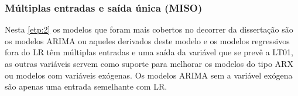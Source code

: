 \subsubsection{M\'ultiplas entradas e sa\'ida \'unica (MISO)}

Nesta \ref{etp:2} os modelos que foram mais cobertos no decorrer da dissertação são os modelos ARIMA ou aqueles derivados deste modelo e os modelos regressivos fora do LR têm múltiplas entradas e uma saída da variável que se prevê a LT01, as outras variáveis servem como suporte para melhorar os modelos do tipo ARX ou modelos com variáveis exógenas. Os modelos ARIMA sem a variável exógena são apenas uma entrada semelhante com LR.